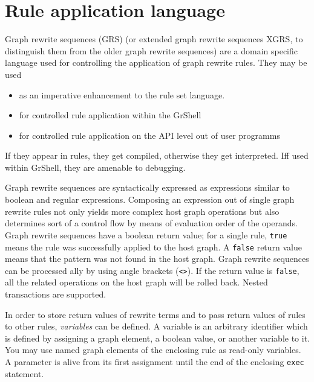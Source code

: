 \chapter{Rule application language}
\label{cha:xgrs}

Graph rewrite sequences (GRS) (or extended graph rewrite sequences XGRS, to distinguish them from the older graph rewrite sequences) are a domain specific \GrG language used for controlling the application of graph rewrite rules. They may be used
\begin{itemize}
\item as an imperative enhancement to the rule set language.
\item for controlled rule application within the GrShell
\item for controlled rule application on the API level out of user programms
\end{itemize}

If they appear in rules, they get compiled, otherwise they get interpreted.
Iff used within GrShell, they are amenable to debugging.

Graph rewrite sequences are syntactically expressed as expressions similar to boolean and regular expressions.
Composing an expression out of single graph rewrite rules not only yields more complex host graph operations but also determines sort of a control flow by means of evaluation order of the operands.
Graph rewrite sequences have a boolean return value; for a single rule, \texttt{true} means the rule was successfully applied to the host graph.
A \texttt{false} return value means that the pattern was not found in the host graph.
Graph rewrite sequences can be processed ally by using angle brackets (\texttt{<>}).
If the return value is \texttt{false}, all the related operations on the host graph will be rolled back.
Nested transactions are supported.

In order to store return values of rewrite terms and to pass return values of rules to other rules, \emph{variables} can be defined.
A variable is an arbitrary identifier which is defined by assigning a graph element, a boolean value, or another variable to it.
You may use named graph elements of the enclosing rule as read-only variables.
A parameter is alive from its first assignment until the end of the enclosing \texttt{exec} statement.

